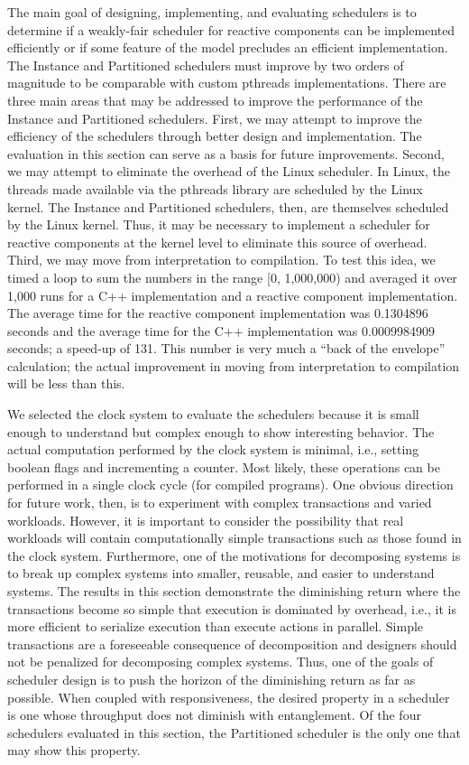 The main goal of designing, implementing, and evaluating schedulers is to determine if a weakly-fair scheduler for reactive components can be implemented efficiently or if some feature of the model precludes an efficient implementation.
The Instance and Partitioned schedulers must improve by two orders of magnitude to be comparable with custom pthreads implementations.
There are three main areas that may be addressed to improve the performance of the Instance and Partitioned schedulers.
First, we may attempt to improve the efficiency of the schedulers through better design and implementation.
The evaluation in this section can serve as a basis for future improvements.
Second, we may attempt to eliminate the overhead of the Linux scheduler.
In Linux, the threads made available via the pthreads library are scheduled by the Linux kernel.
The Instance and Partitioned schedulers, then, are themselves scheduled by the Linux kernel.
Thus, it may be necessary to implement a scheduler for reactive components at the kernel level to eliminate this source of overhead.
Third, we may move from interpretation to compilation.
To test this idea, we timed a loop to sum the numbers in the range [0, 1,000,000) and averaged it over 1,000 runs for a C++ implementation and a reactive component implementation.
The average time for the reactive component implementation was 0.1304896 seconds and the average time for the C++ implementation was 0.0009984909 seconds; a speed-up of 131.
This number is very much a ``back of the envelope'' calculation; the actual improvement in moving from interpretation to compilation will be less than this.

We selected the clock system to evaluate the schedulers because it is small enough to understand but complex enough to show interesting behavior.
The actual computation performed by the clock system is minimal, i.e., setting boolean flags and incrementing a counter.
Most likely, these operations can be performed in a single clock cycle (for compiled programs).
One obvious direction for future work, then, is to experiment with complex transactions and varied workloads.
However, it is important to consider the possibility that real workloads will contain computationally simple transactions such as those found in the clock system.
Furthermore, one of the motivations for decomposing systems is to break up complex systems into smaller, reusable, and easier to understand systems.
The results in this section demonstrate the diminishing return where the transactions become so simple that execution is dominated by overhead, i.e., it is more efficient to serialize execution than execute actions in parallel.
Simple transactions are a foreseeable consequence of decomposition and designers should not be penalized for decomposing complex systems.
Thus, one of the goals of scheduler design is to push the horizon of the diminishing return as far as possible.
When coupled with responsiveness, the desired property in a scheduler is one whose throughput does not diminish with entanglement.
Of the four schedulers evaluated in this section, the Partitioned scheduler is the only one that may show this property.

